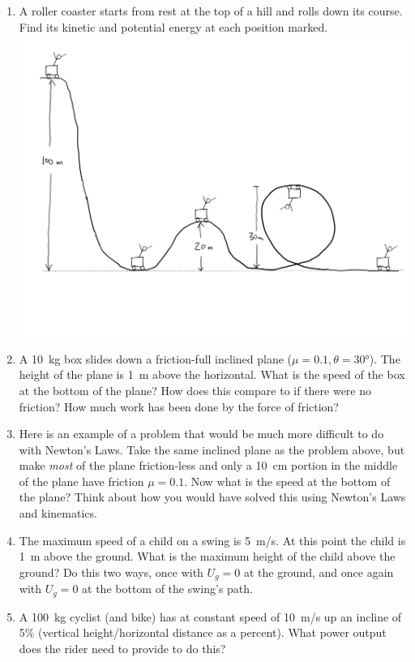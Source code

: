 \begin{enumerate}
\item 
A roller coaster starts from rest at the top of a hill and rolls down its course. Find its kinetic and potential energy at each position marked.\\\includegraphics[scale=0.1]{week7-roller-coaster.png}

\item 
A \SI{10}{kg} box slides down a friction-full inclined plane ($\mu=0.1, \theta=\ang{30}$). The height of the plane is \SI{1}{\meter} above the horizontal. What is the speed of the box at the bottom of the plane? How does this compare to if there were no friction? How much work has been done by the force of friction?\hugeskip

\item 
Here is an example of a problem that would be much more difficult to do with Newton's Laws. Take the same inclined plane as the problem above, but make \emph{most} of the plane friction-less and only a \SI{10}{cm} portion in the middle of the plane have friction $\mu=0.1$. Now what is the speed at the bottom of the plane? Think about how you would have solved this using Newton's Laws and kinematics. \bigskip

\item 
The maximum speed of a child on a swing is \SI{5}{m/s}. At this point the child is \SI{1}{\meter} above the ground. What is the maximum height of the child above the ground? Do this two ways, once with $U_g = 0$ at the ground, and once again with $U_g=0$ at the bottom of the swing's path.\bigskip

\item 
A \SI{100}{\kilogram} cyclist (and bike) has at constant speed of \SI{10}{m/s} up an incline of 5\% (vertical height/horizontal distance as a percent). What power output does the rider need to provide to do this? 


\end{enumerate}
